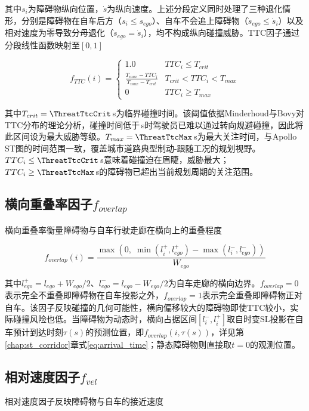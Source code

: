 其中$s_i$为障碍物纵向位置，$\dot{s}$为纵向速度。上述分段定义同时处理了三种退化情形，分别是障碍物在自车后方（$s_i\leq s_{ego}$）、自车不会追上障碍物（$\dot{s}_{ego}\leq\dot{s}_i$）以及相对速度为零导致分母退化（$\dot{s}_{ego}=\dot{s}_i$），均不构成纵向碰撞威胁。TTC因子通过分段线性函数映射至$[0, 1]$

\begin{equation}
    f_{TTC}(i) = \begin{cases}
        1.0 & TTC_i \leq T_{crit} \\[0.3em]
        \displaystyle\frac{T_{max} - TTC_i}{T_{max} - T_{crit}} & T_{crit} < TTC_i < T_{max} \\[0.5em]
        0 & TTC_i \geq T_{max}
    \end{cases}
    \label{eq:f_ttc}
\end{equation}

其中$T_{crit} = \ThreatTtcCrit$\,s为临界碰撞时间。该阈值依据Minderhoud与Bovy\cite{minderhoud2001extended}对TTC分布的理论分析，碰撞时间低于\ThreatTtcCrit\,s时驾驶员已难以通过转向规避碰撞，因此将此区间设为最大威胁等级。$T_{max} = \ThreatTtcMax$\,s为最大关注时间，与Apollo ST图的时间范围一致，覆盖城市道路典型制动-跟随工况的规划视野。$TTC_i \leq \ThreatTtcCrit$\,s意味着碰撞迫在眉睫，威胁最大；$TTC_i \geq \ThreatTtcMax$\,s的障碍物已超出当前规划周期的关注范围。

\subsection{横向重叠率因子$f_{overlap}$}
横向重叠率衡量障碍物与自车行驶走廊在横向上的重叠程度

\begin{equation}
    f_{overlap}(i) = \frac{\max\!\left(0,\; \min(l_i^{+}, l_{ego}^{+}) - \max(l_i^{-}, l_{ego}^{-})\right)}{W_{ego}}
    \label{eq:f_overlap}
\end{equation}

其中$l_{ego}^{+} = l_{ego} + W_{ego}/2$、$l_{ego}^{-} = l_{ego} - W_{ego}/2$为自车走廊的横向边界。$f_{overlap} = 0$表示完全不重叠即障碍物在自车投影之外，$f_{overlap} = 1$表示完全重叠即障碍物正对自车。该因子反映碰撞的几何可能性，横向偏移较大的障碍物即使TTC较小，实际碰撞风险也低。当障碍物为动态时，横向占据区间$[l_i^{-}, l_i^{+}]$取自时变SL投影在自车预计到达时刻$\tau(s)$的预测位置，即$f_{overlap}(i, \tau(s))$，详见第\ref{chap:st_corridor}章式\eqref{eq:arrival_time}；静态障碍物则直接取$t=0$的观测位置。

\subsection{相对速度因子$f_{vel}$}
相对速度因子反映障碍物与自车的接近速度

